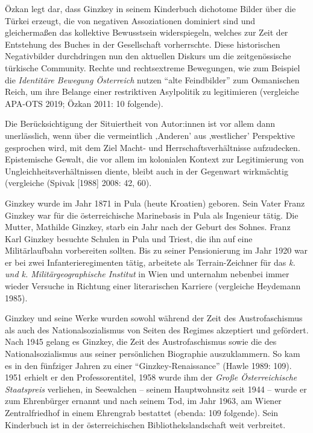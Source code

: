\documentclass[a4paper,
fontsize=11pt,
oneside,
numbers=noperiodatend,
parskip=half-,
bibliography=totoc,
final
]{scrartcl}
\begin{document}
Özkan legt dar, dass Ginzkey in seinem Kinderbuch dichotome Bilder über
die Türkei erzeugt, die von negativen Assoziationen dominiert sind und
gleichermaßen das kollektive Bewusstsein widerspiegeln, welches zur Zeit
der Entstehung des Buches in der Gesellschaft vorherrschte. Diese
historischen Negativbilder durchdringen nun den aktuellen Diskurs um die
zeitgenössische türkische Community. Rechte und rechtsextreme
Bewegungen, wie zum Beispiel die \emph{Identitäre Bewegung Österreich}
nutzen \enquote{alte Feindbilder} zum Osmanischen Reich, um ihre Belange einer
restriktiven Asylpolitik zu legitimieren (vergleiche APA-OTS 2019; Özkan
2011: 10 folgende).

Die Berücksichtigung der Situiertheit von Autor:innen ist vor allem dann
unerlässlich, wenn über die vermeintlich ‚Anderen' aus ‚westlicher'
Perspektive gesprochen wird, mit dem Ziel Macht- und
Herrschaftsverhältnisse aufzudecken. Epistemische Gewalt, die vor allem
im kolonialen Kontext zur Legitimierung von Ungleichheitsverhältnissen
diente, bleibt auch in der Gegenwart wirkmächtig (vergleiche (Spivak
[1988] 2008: 42, 60).

Ginzkey wurde im Jahr 1871 in Pula (heute Kroatien) geboren. Sein Vater
Franz Ginzkey war für die österreichische Marinebasis in Pula als
Ingenieur tätig. Die Mutter, Mathilde Ginzkey, starb ein Jahr nach der
Geburt des Sohnes. Franz Karl Ginzkey besuchte Schulen in Pula und
Triest, die ihn auf eine Militärlaufbahn vorbereiten sollten. Bis zu
seiner Pensionierung im Jahr 1920 war er bei zwei Infanterieregimenten
tätig, arbeitete als Terrain-Zeichner für das \emph{k. und k.
Militärgeographische Institut} in Wien und unternahm nebenbei immer
wieder Versuche in Richtung einer literarischen Karriere (vergleiche
Heydemann 1985).

Ginzkey und seine Werke wurden sowohl während der Zeit des
Austrofaschismus als auch des Nationalsozialismus von Seiten des Regimes
akzeptiert und gefördert. Nach 1945 gelang es Ginzkey, die Zeit des
Austrofaschismus sowie die des Nationalsozialismus aus seiner
persönlichen Biographie auszuklammern. So kam es in den fünfziger Jahren
zu einer \enquote{Ginzkey-Renaissance} (Hawle 1989: 109). 1951 erhielt er den
Professorentitel, 1958 wurde ihm der \emph{Große Österreichische
Staatspreis} verliehen, in Seewalchen -- seinem Hauptwohnsitz seit 1944
-- wurde er zum Ehrenbürger ernannt und nach seinem Tod, im Jahr 1963,
am Wiener Zentralfriedhof in einem Ehrengrab bestattet (ebenda: 109
folgende). Sein Kinderbuch ist in der österreichischen
Bibliothekslandschaft weit verbreitet.
\end{document}
